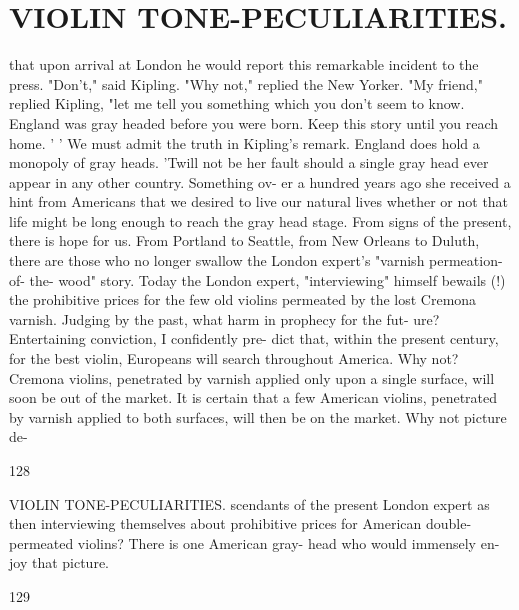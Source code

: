 \documentclass{article}
\begin{document}
\section*{VIOLIN TONE-PECULIARITIES.}
that upon arrival at London he would report this remarkable incident to the press. "Don't," said Kipling. "Why not," replied the New Yorker. "My friend," replied Kipling, "let me tell you something which you don't seem to know. England was gray headed before you were born. Keep this story until you reach home. ' ' We must admit the truth in Kipling's remark. England does hold a monopoly of gray heads. 'Twill not be her fault should a single gray head ever appear in any other country. Something ov- er a hundred years ago she received a hint from Americans that we desired to live our natural lives whether or not that life might be long enough to reach the gray head stage. From signs of the present, there is hope for us. From Portland to Seattle, from New Orleans to Duluth, there are those who no longer swallow the London expert's "varnish permeation-of- the- wood" story. Today the London expert, "interviewing" himself bewails (!) the prohibitive prices for the few old violins permeated by the lost Cremona varnish. Judging by the past, what harm in prophecy for the fut- ure? Entertaining conviction, I confidently pre- dict that, within the present century, for the best violin, Europeans will search throughout America. Why not? Cremona violins, penetrated by varnish applied only upon a single surface, will soon be out of the market. It is certain that a few American violins, penetrated by varnish applied to both surfaces, will then be on the market. Why not picture de-

128

VIOLIN TONE-PECULIARITIES. scendants of the present London expert as then interviewing themselves about prohibitive prices for American double-permeated violins? There is one American gray- head who would immensely en- joy that picture.

129
\end{document}
